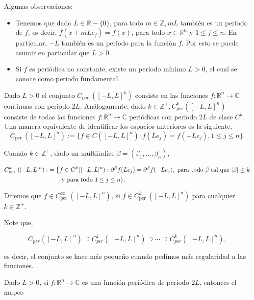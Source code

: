 \documentclass[12pt]{article}
\newcommand\R{\ensuremath{\mathbb{R}}}
\begin{document}
Algunas observaciones:
\begin{itemize}
    \item  Tenemos que dado $L\in \R-\{0\}$, para todo $m \in \mathbb{Z}, m L$ también es un periodo de $f$, es  decir, $f(x+m L e_j)=f(x)$, para todo $x \in \mathbb{R}^n $ y $1\leq j\leq n$. En particular, $-L$ también es un periodo para la función $f$. Por esto se puede asumir en particular que $L>0$.
    
    \item Si $f$ es periódica no constante, existe un periodo mínimo $L>0$, el cual se conoce como periodo fundamental.
\end{itemize}

\begin{note}
    Dado $L>0$ el conjunto $C_{\text {per }}([-L, L]^n)$ consiste en las funciones $f: \mathbb{R}^n \rightarrow \mathbb{C}$ continuas con periodo $2L$. Análogamente, dado $k \in \mathbb{Z}^{+}, C_{p e r}^k([-L, L]^n)$ consiste de todas las funciones $f: \mathbb{R}^n \rightarrow \mathbb{C}$ periódicas con periodo $2 L$ de clase $C^k$.\\

Una manera equivalente de identificar los espacios anteriores es la siguiente,
$$
C_{\text {per }}([-L, L]^n):=\{f \in C([-L, L]^n): f(Le_j)=f(-Le_j), 1\leq j\leq n\}.
$$


Cuando $k \in \mathbb{Z}^{+}$, dado un multiíndice $\beta=(\beta_1,\ldots,\beta_n)$,

\begin{align*}
    C_{\text {per }}^k([-L, L]^n):&=\left\{f \in C^k([-L, L]^n): \partial^{\beta}f(Le_j)=\partial^{\beta}f(-Le_j), \text{ para todo } \beta \text{ tal que } |\beta|\leq k\right. \\
    &\hspace{0.8cm} \text{y para todo } 1\leq j\leq n\}.
\end{align*}

Diremos que $f \in C_{\text {per }}^{\infty}([-L, L]^n)$, si $f \in C_{\text {per }}^k([-L, L]^n)$ para cualquier $k \in \mathbb{Z}^{+}$.
\end{note}


Note que,

$$
C_{p e r}([-L, L]^n) \supseteq C_{p e r}^1([-L, L]^n) \supseteq \cdots \supseteq C_{p e r}^k([-L, L]^n),
$$

es decir, el conjunto se hace más pequeño cuando pedimos más regularidad a las funciones.

Dado $L>0$, si $f: \mathbb{R}^n \rightarrow \mathbb{C}$ es una función periódica de periodo $2 L$, entonces el mapeo
\end{document}
